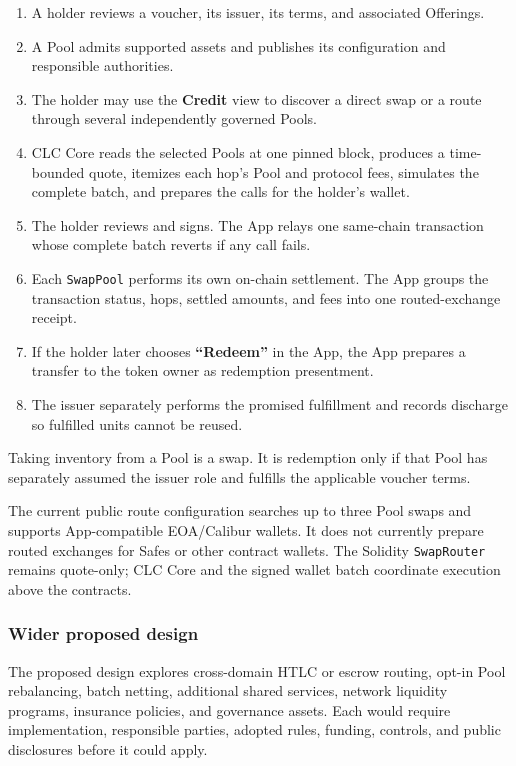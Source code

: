 \documentclass[11pt]{article}
\begin{document}
\begin{enumerate}[leftmargin=*]
\item A holder reviews a voucher, its issuer, its terms, and associated Offerings.
\item A Pool admits supported assets and publishes its configuration and responsible authorities.
\item The holder may use the \textbf{Credit} view to discover a direct swap or a route through several independently governed Pools.
\item CLC Core reads the selected Pools at one pinned block, produces a time-bounded quote, itemizes each hop's Pool and protocol fees, simulates the complete batch, and prepares the calls for the holder's wallet.
\item The holder reviews and signs. The App relays one same-chain transaction whose complete batch reverts if any call fails.
\item Each \texttt{SwapPool} performs its own on-chain settlement. The App groups the transaction status, hops, settled amounts, and fees into one routed-exchange receipt.
\item If the holder later chooses \textbf{``Redeem''} in the App, the App prepares a transfer to the token owner as redemption presentment.
\item The issuer separately performs the promised fulfillment and records discharge so fulfilled units cannot be reused.
\end{enumerate}
Taking inventory from a Pool is a swap. It is redemption only if that Pool has separately assumed the issuer role and fulfills the applicable voucher terms.

The current public route configuration searches up to three Pool swaps and supports App-compatible EOA/Calibur wallets. It does not currently prepare routed exchanges for Safes or other contract wallets. The Solidity \texttt{SwapRouter} remains quote-only; CLC Core and the signed wallet batch coordinate execution above the contracts.

\subsubsection*{Wider proposed design}

The proposed design explores cross-domain HTLC or escrow routing, opt-in Pool rebalancing, batch netting, additional shared services, network liquidity programs, insurance policies, and governance assets. Each would require implementation, responsible parties, adopted rules, funding, controls, and public disclosures before it could apply.
\end{document}

